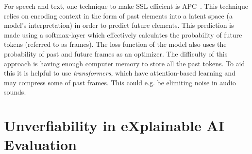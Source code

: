 \documentclass[10pt,twocolumn,letterpaper]{article}
\begin{document}
For speech and text, one technique to make \gls{SSL} efficient is \gls{APC}~\cite{chung2020generative}. This technique relies on encoding context in the form of past elements into a latent space (a model's interpretation) in order to predict future elements. This prediction is made using a softmax-layer which effectively calculates the probability of future tokens (referred to as frames). The loss function of the model also uses the probability of past and future frames as an optimizer. The difficulty of this approach is having enough computer memory to store all the past tokens. To aid this it is helpful to use \textit{transformers}, which have attention-based learning and may compress some of past frames. This could e.g. be elimiting noise in audio sounds.


\section{Unverfiability in eXplainable AI Evaluation}

\end{document}
